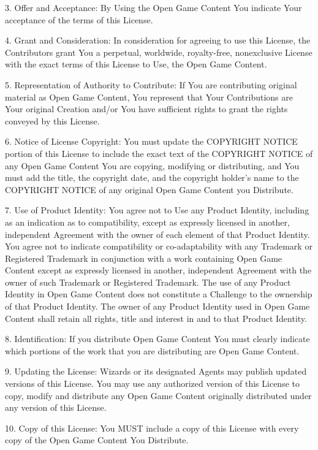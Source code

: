 \documentclass[letterpaper,twocolumn,openany,nodeprecatedcode]{dndbook}
\begin{document}
3. Offer and Acceptance: By Using the Open Game Content You indicate Your acceptance of the terms of this License.

4. Grant and Consideration: In consideration for agreeing to use this License, the Contributors grant You a perpetual, worldwide, royalty-free, nonexclusive License with the exact terms of this License to Use, the Open Game Content.

5. Representation of Authority to Contribute: If You are contributing original material as Open Game Content, You represent that Your Contributions are Your original Creation and/or You have sufficient rights to grant the rights conveyed by this License.

6. Notice of License Copyright: You must update the COPYRIGHT NOTICE portion of this License to include the exact text of the COPYRIGHT NOTICE of any Open Game Content You are copying, modifying or distributing, and You must add the title, the copyright date, and the copyright holder’s name to the COPYRIGHT NOTICE of any original Open Game Content you Distribute.

7. Use of Product Identity: You agree not to Use any Product Identity, including as an indication as to compatibility, except as expressly licensed in another, independent Agreement with the owner of each element of that Product Identity. You agree not to indicate compatibility or co-adaptability with any Trademark or Registered Trademark in conjunction with a work containing Open Game Content except as expressly licensed in another, independent Agreement with the owner of such Trademark or Registered Trademark. The use of any Product Identity in Open Game Content does not constitute a Challenge to the ownership of that Product Identity. The owner of any Product Identity used in Open Game Content shall retain all rights, title and interest in and to that Product Identity.

8. Identification: If you distribute Open Game Content You must clearly indicate which portions of the work that you are distributing are Open Game Content.

9. Updating the License: Wizards or its designated Agents may publish updated versions of this License. You may use any authorized version of this License to copy, modify and distribute any Open Game Content originally distributed under any version of this License.

10. Copy of this License: You MUST include a copy of this License with every copy of the Open Game Content You Distribute.
\end{document}
